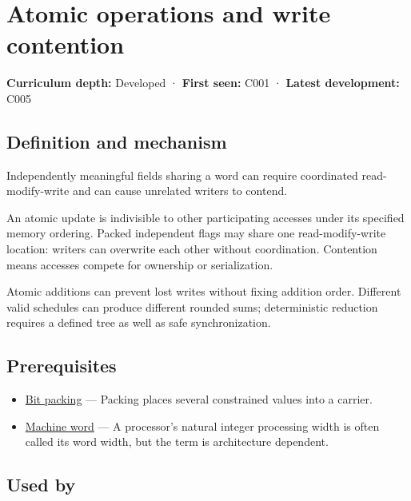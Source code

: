 \hypertarget{appendix-e12d1b03fefb}{}
\section{Atomic operations and write contention}\label{appendix-e12d1b03fefb-atomic-operations-and-write-contention}

\textbf{Curriculum depth:} Developed · \textbf{First seen:} C001 · \textbf{Latest development:} C005

\subsection{Definition and mechanism}\label{appendix-e12d1b03fefb-definition-and-mechanism}

Independently meaningful fields sharing a word can require coordinated read-modify-write and can cause unrelated writers to contend.

An atomic update is indivisible to other participating accesses under its specified memory ordering. Packed independent flags may share one read-modify-write location: writers can overwrite each other without coordination. Contention means accesses compete for ownership or serialization.

Atomic additions can prevent lost writes without fixing addition order. Different valid schedules can produce different rounded sums; deterministic reduction requires a defined tree as well as safe synchronization.

\subsection{Prerequisites}\label{appendix-e12d1b03fefb-prerequisites}

\begin{itemize}
\tightlist
\item
  \hyperref[appendix-1f9963e1a5d1]{Bit packing} --- Packing places several constrained values into a carrier.
\item
  \hyperref[appendix-d67a19507dc5]{Machine word} --- A processor's natural integer processing width is often called its word width, but the term is architecture dependent.
\end{itemize}

\subsection{Used by}\label{appendix-e12d1b03fefb-used-by}

